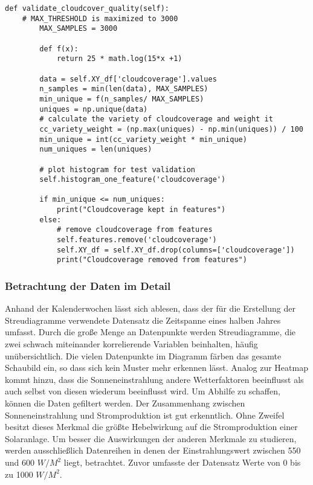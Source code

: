 \documentclass[12pt, a4paper]{article}
\begin{document}
\begin{lstlisting}[basicstyle=\small,label={lst:validate_cloudcover}, caption={Funktion zur Validierung der Bewölkungsdaten}]
def validate_cloudcover_quality(self):        
	# MAX_THRESHOLD is maximized to 3000
        MAX_SAMPLES = 3000       
        
        def f(x):            
            return 25 * math.log(15*x +1)
        
        data = self.XY_df['cloudcoverage'].values        
        n_samples = min(len(data), MAX_SAMPLES)
        min_unique = f(n_samples/ MAX_SAMPLES)
        uniques = np.unique(data)
        # calculate the variety of cloudcoverage and weight it
        cc_variety_weight = (np.max(uniques) - np.min(uniques)) / 100
        min_unique = int(cc_variety_weight * min_unique)
        num_uniques = len(uniques)
        
        # plot histogram for test validation
        self.histogram_one_feature('cloudcoverage')
                
        if min_unique <= num_uniques:
            print("Cloudcoverage kept in features")
        else:
            # remove cloudcoverage from features
            self.features.remove('cloudcoverage')
            self.XY_df = self.XY_df.drop(columns=['cloudcoverage'])
            print("Cloudcoverage removed from features")
\end{lstlisting}



\subsubsection{Betrachtung der Daten im Detail}

Anhand der Kalenderwochen lässt sich ablesen, dass der für die Erstellung der Streudiagramme verwendete Datensatz die Zeitspanne eines halben Jahres umfasst. Durch die große Menge an Datenpunkte werden Streudiagramme, die zwei schwach miteinander korrelierende Variablen beinhalten, häufig unübersichtlich. Die vielen Datenpunkte im Diagramm färben das gesamte Schaubild ein, so dass sich kein Muster mehr erkennen lässt. Analog zur Heatmap kommt hinzu, dass die Sonneneinstrahlung andere Wetterfaktoren beeinflusst als auch selbst von diesen wiederum beeinflusst wird. Um Abhilfe zu schaffen, können die Daten gefiltert werden. Der Zusammenhang zwischen Sonneneinstrahlung und Stromproduktion ist gut erkenntlich. Ohne Zweifel besitzt dieses Merkmal die größte Hebelwirkung auf die Stromproduktion einer Solaranlage. Um besser die Auswirkungen der anderen Merkmale zu studieren, werden ausschließlich Datenreihen in denen der Einstrahlungswert zwischen 550 und 600 $W/ M^2$ liegt, betrachtet. Zuvor umfasste der Datensatz Werte von 0 bis zu 1000 $W/ M^2$.
\end{document}
